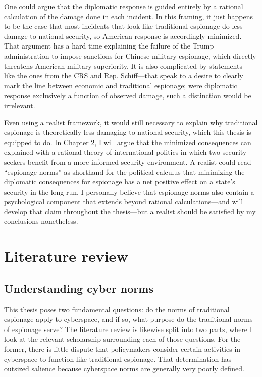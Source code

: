 \documentclass[11pt]{memoir}
\begin{document}
\begin{refsegment}
One could argue that the diplomatic response is guided entirely by a rational calculation of the damage done in each incident. In this framing, it just happens to be the case that most incidents that look like traditional espionage do less damage to national security, so American response is accordingly minimized. That argument has a hard time explaining the failure of the Trump administration to impose sanctions for Chinese military espionage, which directly threatens American military superiority. It is also complicated by statements---like the ones from the CRS and Rep. Schiff---that speak to a desire to clearly mark the line between economic and traditional espionage; were diplomatic response exclusively a function of observed damage, such a distinction would be irrelevant.

Even using a realist framework, it would still necessary to explain why traditional espionage is theoretically less damaging to national security, which this thesis is equipped to do. In Chapter 2, I will argue that the minimized consequences can explained with a rational theory of international politics in which two security-seekers benefit from a more informed security environment. A realist could read ``espionage norms'' as shorthand for the political calculus that minimizing the diplomatic consequences for espionage has a net positive effect on a state's security in the long run. I personally believe that espionage norms also contain a psychological component that extends beyond rational calculations---and will develop that claim throughout the thesis---but a realist should be satisfied by my conclusions nonetheless.


\section{Literature review}
\subsection{Understanding cyber norms}
This thesis poses two fundamental questions: do the norms of traditional espionage apply to cyberspace, and if so, what purpose do the traditional norms of espionage serve? The literature review is likewise split into two parts, where I look at the relevant scholarship surrounding each of those questions. For the former, there is little dispute that policymakers consider certain activities in cyberspace to function like traditional espionage. That determination has outsized salience because cyberspace norms are generally very poorly defined.


\end{refsegment}
\end{document}
